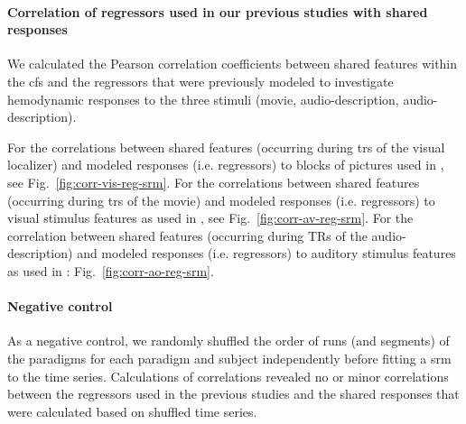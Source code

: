 \paragraph{Correlation of regressors used in our previous studies with shared
responses}






We calculated the Pearson correlation coefficients between shared features
within the \ac{cfs} and the regressors that were previously modeled
\citep{sengupta2016extension, haeusler2022processing} to investigate hemodynamic
responses to the three stimuli (movie, audio-description, audio-description).

%
For the correlations between shared features (occurring during \acp{tr} of the
visual localizer) and  modeled responses (i.e. regressors) to blocks of pictures
used in \citet{sengupta2016extension}, see Fig.~\ref{fig:corr-vis-reg-srm}.
%
For the correlations between shared features (occurring during \acp{tr} of the
movie) and modeled responses (i.e. regressors) to visual stimulus features as
used in \citet{haeusler2022processing}, see Fig.~\ref{fig:corr-av-reg-srm}.
%
For the correlation between shared features (occurring during TRs of the
audio-description) and modeled responses (i.e. regressors) to auditory stimulus
features as used in \citet{haeusler2022processing}:
Fig.~\ref{fig:corr-ao-reg-srm}.



\paragraph{Negative control}
As a negative control, we randomly shuffled the order of runs (and segments) of
the paradigms for each paradigm and subject independently before fitting a
\ac{srm} to the time series.
Calculations of correlations revealed no or minor correlations between the
regressors used in the previous studies and the shared responses that were
calculated based on shuffled time series.



